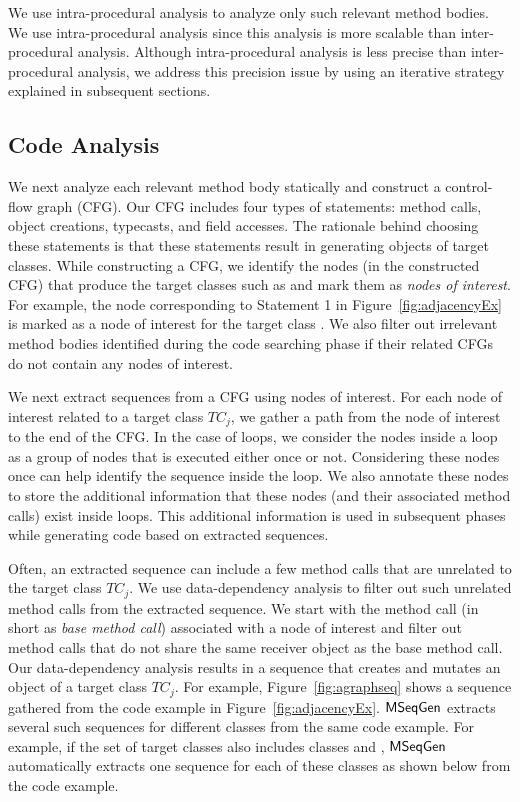 We use intra-procedural analysis to analyze only such relevant method bodies. We use intra-procedural analysis since this analysis is more scalable than inter-procedural analysis. Although intra-procedural analysis is less precise than inter-procedural analysis, we address this precision issue by using an iterative strategy explained in subsequent sections. 


\subsection{Code Analysis} 

We next analyze each relevant method body statically and construct a control-flow graph (CFG). Our CFG includes four
types of statements: method calls, object creations, typecasts, and field accesses. The rationale behind choosing these statements is that these statements result in generating objects of target classes. While constructing a CFG, we identify the nodes (in the constructed CFG) that produce the target classes such as  and mark them as \emph{nodes of interest}. For example, the node corresponding to Statement 1 in Figure~\ref{fig:adjacencyEx} is marked as a node of interest for the target class . We also filter out irrelevant method bodies identified during the code searching phase if their related CFGs do not contain any nodes of interest.

We next extract sequences from a CFG using nodes of interest. For each node of interest related to a target class $TC_j$, we gather a path from the node of interest to the end of the CFG. In the case of loops, we consider the nodes inside a loop as a group of nodes that is executed either once or not. Considering these nodes once can help identify the sequence inside the loop. We also annotate these nodes to store the additional information that these nodes (and their associated method calls) exist inside loops. This additional information is used in subsequent phases while generating code based on extracted sequences.

Often, an extracted sequence can include a few method calls that are unrelated to the target class $TC_j$. We use data-dependency analysis to filter out such unrelated method calls from the extracted sequence. We start with the method call (in short as \emph{base method call}) associated with a node of interest and filter out method calls that do not share the same receiver object as the base method call. Our data-dependency analysis results in a sequence that creates and mutates an object of a target class $TC_j$. For example, Figure~\ref{fig:agraphseq} shows a sequence gathered from the code example in Figure~\ref{fig:adjacencyEx}. $\textsf{MSeqGen} $ extracts several such  sequences for different classes from the same code example. For example, if the set of target classes also includes classes  and , $\textsf{MSeqGen} $ automatically extracts one  sequence for each of these classes as shown below from the code example. 

